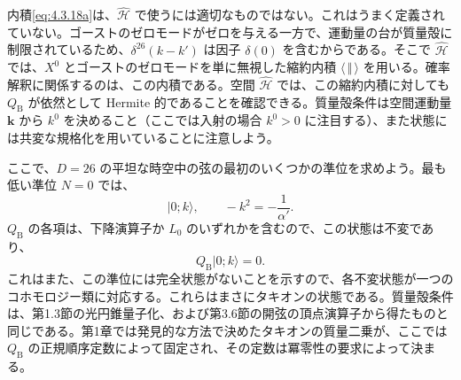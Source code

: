 内積\eqref{eq:4.3.18a}は、$\widehat{\mathcal H}$ で使うには適切なものではない。これはうまく定義されていない。ゴーストのゼロモードがゼロを与える一方で、運動量の台が質量殻に制限されているため、$\delta^{26}(k-k')$ は因子 $\delta(0)$ を含むからである。そこで $\widehat{\mathcal H}$ では、$X^0$ とゴーストのゼロモードを単に無視した縮約内積 $\langle\,\Vert\,\rangle$ を用いる。確率解釈に関係するのは、この内積である。空間 $\widehat{\mathcal H}$ では、この縮約内積に対しても $Q_{\mathrm B}$ が依然として Hermite 的であることを確認できる。質量殻条件は空間運動量 $\mathbf k$ から $k^0$ を決めること（ここでは入射の場合 $k^0>0$ に注目する）、また状態には共変な規格化を用いていることに注意しよう。

ここで、$D=26$ の平坦な時空中の弦の最初のいくつかの準位を求めよう。最も低い準位 $N=0$ では、
\begin{equation}
|0;k\rangle,\qquad -k^2=-\frac1{\alpha'}.
\tag{4.3.23}\label{eq:4.3.23}
\end{equation}
$Q_{\mathrm B}$ の各項は、下降演算子か $L_0$ のいずれかを含むので、この状態は不変であり、
\begin{equation}
Q_{\mathrm B}|0;k\rangle=0.
\tag{4.3.24}\label{eq:4.3.24}
\end{equation}
これはまた、この準位には完全状態がないことを示すので、各不変状態が一つのコホモロジー類に対応する。これらはまさにタキオンの状態である。質量殻条件は、第1.3節の光円錐量子化、および第3.6節の開弦の頂点演算子から得たものと同じである。第1章では発見的な方法で決めたタキオンの質量二乗が、ここでは $Q_{\mathrm B}$ の正規順序定数によって固定され、その定数は冪零性の要求によって決まる。

